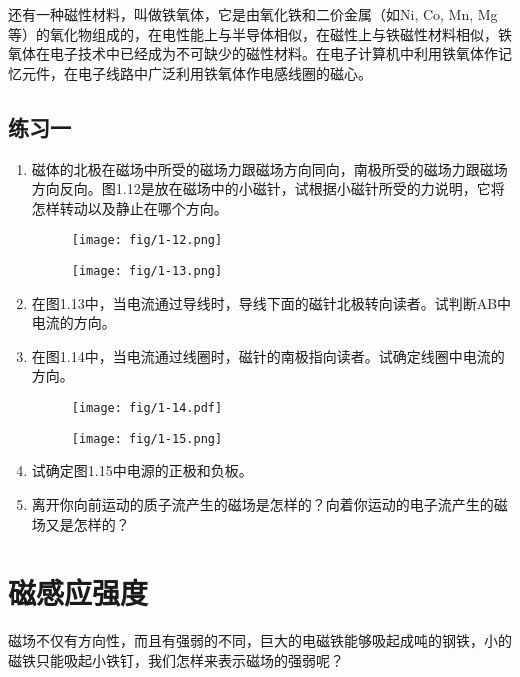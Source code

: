 还有一种磁性材料，叫做铁氧体，它是由氧化铁和二价金属（如Ni, Co, Mn, Mg等）的氧化物组成的，在电性能上与半导体相似，在磁性上与铁磁性材料相似，铁氧体在电子技术中已经成为不可缺少的磁性材料。在电子计算机中利用铁氧体作记忆元件，在电子线路中广泛利用铁氧体作电感线圈的磁心。

\subsection*{练习一}
\begin{enumerate}
    \item 磁体的北极在磁场中所受的磁场力跟磁场方向同向，南极所受的磁场力跟磁场方向反向。图1.12是放在磁场中的小磁针，试根据小磁针所受的力说明，它将怎样转动以及静止在哪个方向。
\begin{figure}[htp]
\centering
\begin{minipage}[t]{0.48\textwidth}
\centering
\texttt{[image: fig/1-12.png]}
\caption{}
\end{minipage}
\begin{minipage}[t]{0.48\textwidth}
\centering
\texttt{[image: fig/1-13.png]}
\caption{}
\end{minipage}
\end{figure}
    \item 在图1.13中，当电流通过导线时，导线下面的磁针北极转向读者。试判断AB中电流的方向。
    \item 在图1.14中，当电流通过线圈时，磁针的南极指向读者。试确定线圈中电流的方向。
\begin{figure}[htp]
\centering
\begin{minipage}[t]{0.48\textwidth}
\centering
\texttt{[image: fig/1-14.pdf]}
\caption{}
\end{minipage}
\begin{minipage}[t]{0.48\textwidth}
\centering
\texttt{[image: fig/1-15.png]}
\caption{}
\end{minipage}
\end{figure}

    \item 试确定图1.15中电源的正极和负板。
    \item 离开你向前运动的质子流产生的磁场是怎样的？向着你运动的电子流产生的磁场又是怎样的？
\end{enumerate}

\section{磁感应强度}
磁场不仅有方向性，而且有强弱的不同，巨大的电磁铁能够吸起成吨的钢铁，小的磁铁只能吸起小铁钉，我们怎样来表示磁场的强弱呢？

